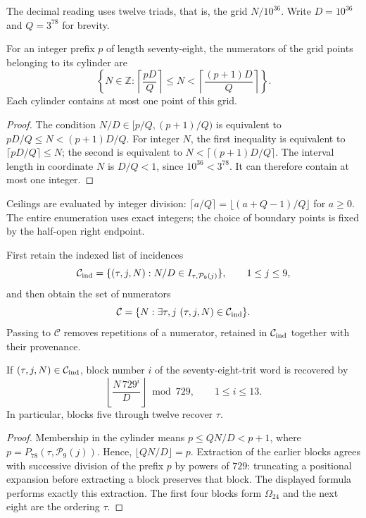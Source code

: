 The decimal reading uses twelve triads, that is, the grid
$N/10^{36}$. Write $D=10^{36}$ and $Q=3^{78}$ for brevity.

\begin{lemma}
For an integer prefix $p$ of length seventy-eight, the numerators
of the grid points belonging to its cylinder are
\begin{equation}
 \left\{N\in\mathbb Z:
 \left\lceil\frac{pD}{Q}\right\rceil
 \leq N<
 \left\lceil\frac{(p+1)D}{Q}\right\rceil\right\}.
 \label{act21:eq:kdes-rejilla}
\end{equation}
Each cylinder contains at most one point of this grid.
\end{lemma}
\begin{proof}
The condition $N/D\in[p/Q,(p+1)/Q)$ is equivalent to
$pD/Q\leq N<(p+1)D/Q$. For integer $N$, the first inequality
is equivalent to $\lceil pD/Q\rceil\leq N$; the second is equivalent to
$N<\lceil(p+1)D/Q\rceil$. The interval length in coordinate
$N$ is $D/Q<1$, since $10^{36}<3^{78}$. It can therefore contain
at most one integer.
\end{proof}

Ceilings are evaluated by integer division:
$\lceil a/Q\rceil=\lfloor(a+Q-1)/Q\rfloor$ for $a\geq0$.
The entire enumeration uses exact integers; the choice of boundary
points is fixed by the half-open right endpoint.

First retain the indexed list of incidences
\[
 \mathcal C_{\rm ind}=
 \{(\tau,j,N):N/D\in I_{\tau,\mathcal P_9(j)}\},
 \qquad1\leq j\leq9,
\]
and then obtain the set of numerators
\[
 \mathcal C=\{N:\exists\tau,j\ (\tau,j,N)\in\mathcal C_{\rm ind}\}.
\]
Passing to $\mathcal C$ removes repetitions of a numerator, retained
in $\mathcal C_{\rm ind}$ together with their provenance.

\begin{lemma}
If $(\tau,j,N)\in\mathcal C_{\rm ind}$, block number $i$ of the
seventy-eight-trit word is recovered by
\[
 \left\lfloor\frac{N\,729^i}{D}\right\rfloor\bmod729,
 \qquad1\leq i\leq13.
\]
In particular, blocks five through twelve recover $\tau$.
\end{lemma}
\begin{proof}
Membership in the cylinder means
$p\leq QN/D<p+1$, where $p=P_{78}(\tau,\mathcal P_9(j))$.
Hence, $\lfloor QN/D\rfloor=p$. Extraction of the
earlier blocks agrees with successive division of the prefix $p$ by
powers of $729$: truncating a positional expansion before extracting
a block preserves that block. The displayed formula performs
exactly this extraction. The first four blocks form
$\Omega_{24}$ and the next eight are the ordering $\tau$.
\end{proof}

